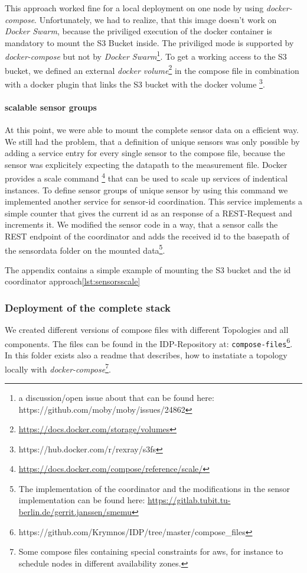 This approach worked fine for a local deployment on one node by using \emph{docker-compose}. Unfortunately, we had to realize, that this image doesn't work on \emph{Docker Swarm}, because the priviliged execution of the docker container is mandatory to mount the S3 Bucket inside. The priviliged mode is supported by \emph{docker-compose} but not by \emph{Docker Swarm}\footnote{a discussion/open issue about that can be found here: https://github.com/moby/moby/issues/24862}.
To get a working access to the S3 bucket, we defined an external \emph{docker volume}\footnote{\url{https://docs.docker.com/storage/volumes}} in the compose file in combination with a docker plugin that links the S3 bucket with the docker volume \footnote{https://hub.docker.com/r/rexray/s3fs}.

\paragraph*{scalable sensor groups}
At this point, we were able to mount the complete sensor data on a efficient way. We still had the problem, that a definition of unique sensors was only possible by adding a service entry for every single sensor to the compose file, because the sensor was explicitely expecting the datapath to the measurement file.
Docker provides a scale command \footnote{\url{https://docs.docker.com/compose/reference/scale/}} that can be used to scale up services of indentical instances. To define sensor groups of unique sensor by using this command we implemented another service for sensor-id coordination. This service implements a simple counter that gives the current id as an response of a REST-Request and increments it.
We modified the sensor code in a way, that a sensor calls the REST endpoint of the coordinator and adds the received id to the basepath of the sensordata folder on the mounted data\footnote{The implementation of the coordinator and the modifications in the sensor implementation can be found here: \url{https://gitlab.tubit.tu-berlin.de/gerrit.janssen/smemu}}. 

The appendix contains a simple example of mounting the S3 bucket and the id coordinator approach\ref{lst:sensorsscale}


\subsubsection*{Deployment of the complete stack}
We created different versions of compose files with different Topologies and all components. The files can be found in the IDP-Repository at: \texttt{compose-files}\footnote{https://github.com/Krymnos/IDP/tree/master/compose\_files}. In this folder exists also a readme that describes, how to instatiate a topology locally  with \emph{docker-compose}\footnote{ Some compose files containing special constraints for aws, for instance to schedule nodes in different availability zones.}.

